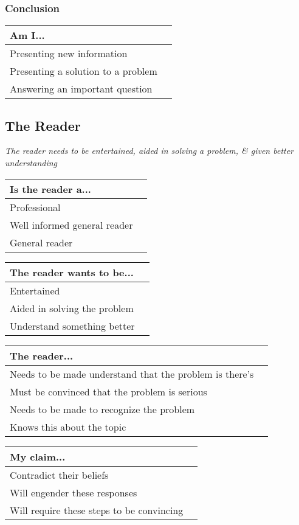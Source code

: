 \documentclass[10pt, a4paper]{article}
\begin{document}
\subsubsection{Conclusion}
\begin{center}
	\begin{tabular}{|l |l|}
		\hline
		Am I... & \\
		\hline
		Presenting new information & \\
		\hline
		Presenting a solution to a problem & \\
		\hline
		Answering an important question &\\ 
		\hline
	\end{tabular}
\end{center}
\subsection{The Reader}
\emph{The reader needs to be entertained, aided in solving a problem, \& given better understanding}
\begin{center}
	\begin{tabular}{|l |l|}
		\hline
		Is the reader a... &\\
		\hline
		Professional &\\
		\hline
		Well informed general reader&\\
		\hline
		General reader &\\
		\hline
	\end{tabular}
\end{center}
\begin{center}
	\begin{tabular}{|l |l|}
		\hline
		The reader wants to be... &\\
		\hline
		Entertained&\\
		\hline
		Aided in solving the problem&\\ 
		\hline
		Understand something better &\\
		\hline
	\end{tabular}
\end{center}
\begin{center}
	\begin{tabular}{|l |l|}
		\hline
		The reader...&\\
		\hline
		Needs to be made understand that the problem is there's&\\
		\hline
		Must be convinced that the problem is serious&\\ 
		\hline
		Needs to be made to recognize the problem&\\
		\hline
		Knows this about the topic&\\
		\hline
	\end{tabular}
\end{center}
\begin{center}
	\begin{tabular}{|l |l|}
		\hline
		My claim...&\\
		\hline
		Contradict their beliefs&\\
		\hline
		Will engender these responses&\\
		\hline
		Will require these steps to be convincing&\\
		\hline
	\end{tabular}
\end{center}




\end{document}
